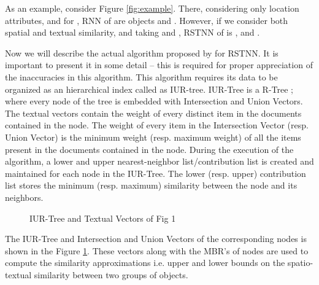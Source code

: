 \documentclass[prodmode,letterpaper]{acmsmall}
\newcommand{\rknn}{RNN\xspace}
\newcommand{\rstknn}{RSTNN\xspace}
\begin{document}
As an example, consider Figure \ref{fig:example}. There, considering only
location attributes, and for , \rknn of  are objects  and .
However, if we consider both spatial and textual similarity, and taking 
and , \rstknn of  is ,  and .

Now we will describe the actual algorithm proposed by \cite{lu2011reverse} for 
\rstknn. It is important to present it in some detail -- this is required for
proper appreciation of the inaccuracies in this algorithm. This algorithm
requires its data to be organized as an hierarchical index called as
IUR-tree. IUR-Tree is a R-Tree \cite{guttman1984r}; where every node of the tree is embedded with Intersection and Union Vectors. The textual vectors contain the weight of every distinct item in the documents contained in the node. The weight of every item in the Intersection Vector (resp. Union Vector) is the minimum weight (resp. maximum weight) of all the items present in the documents contained in the node. During the execution of the algorithm, a lower and upper nearest-neighbor list/contribution list is created and maintained for each node in the IUR-Tree. The lower (resp. upper) contribution list stores the minimum (resp. maximum) similarity between the node and its neighbors.
\begin{figure}[!tbh]
\begin{center}

\caption{\small IUR-Tree and Textual Vectors of Fig 1 \label{fig:IUR}}
\end{center}

\end{figure}

The IUR-Tree and Intersection and Union Vectors of the corresponding nodes is shown in the Figure \ref{fig:IUR}.
 These vectors along with the MBR's of nodes are used to compute the similarity approximations i.e. upper and lower bounds on the spatio-textual similarity between two groups of objects. 
\end{document}

